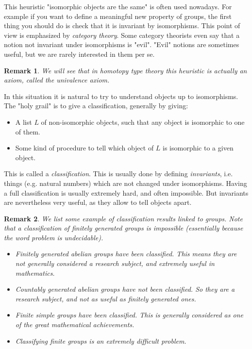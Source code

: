 \documentclass{article}
\newtheorem{remark}{Remark}
\begin{document}
This heuristic "isomorphic objects are the same" is often used nowadays. For example if you want to define a meaningful new property of groups, the first thing you should do is check that it is invariant by isomorphisms. This point of view is emphasized by \emph{category theory}. Some category theorists even say that a notion not invariant under isomorphisms is "evil". "Evil" notions are sometimes useful, but we are rarely interested in them per se.

\begin{remark}
We will see that in homotopy type theory this heuristic is actually an axiom, called the \emph{univalence axiom}. 
\end{remark}



In this situation it is natural to try to understand objects up to isomorphisms. The "holy grail" is to give a classification, generally by giving:
\begin{itemize}
\item A list $L$ of non-isomorphic objects, such that any object is isomorphic to one of them.
\item Some kind of procedure to tell which object of $L$ is isomorphic to a given object. 
\end{itemize}

This is called a \emph{classification}. This is usually done by defining \emph{invariants}, i.e. things (e.g. natural numbers) which are not changed under isomorphisms. Having a full classification is usually extremely hard, and often impossible. But invariants are nevertheless very useful, as they allow to tell objects apart.

\begin{remark}
We list some example of classification results linked to groups. Note that a classification of finitely generated groups is impossible (essentially because the word problem is undecidable).
\begin{itemize}
\item Finitely generated abelian groups have been classified. This means they are not generally considered a research subject, and extremely useful in mathematics. 
\item Countably generated abelian groups have not been classified. So they are a research subject, and not as useful as finitely generated ones.%
\item Finite simple groups have been classified. This is generally considered as one of the great mathematical achievements.
\item Classifying finite groups is an extremely difficult problem.
\end{itemize}
\end{remark}
\end{document}
